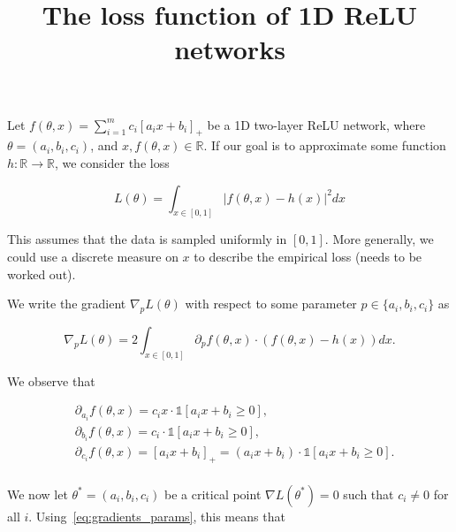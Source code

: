 \documentclass{article}
\title{{\bf The loss function of 1D ReLU networks}}
\author{}
\date{}
\newcommand{\RR}{\mathbb{R}}
\begin{document}
\maketitle

Let $f(\theta,x) = \sum_{i=1}^m c_i [a_ix + b_i]_+$ be a 1D two-layer ReLU
network, where $\theta = (a_i,b_i,c_i)$, and $x, f(\theta,x) \in \RR$. If our
goal is to approximate some function $h:\RR\rightarrow \RR$, we consider the
loss

\begin{equation}\label{eq:loss_uniform}
L(\theta) = \int_{x \in [0,1]} |f(\theta,x) - h(x)|^2 dx
\end{equation}

This assumes that the data is sampled uniformly in $[0,1]$. More generally, we
could use a discrete measure on $x$ to describe the empirical loss (needs to be
worked out).

We write the gradient $\nabla_p L(\theta)$ with respect to some parameter
$p \in \{a_i,b_i,c_i\}$ as

\begin{equation}\label{eq:gradient}
\nabla_p L(\theta) = 2 \int_{x \in [0,1]} \partial_p f(\theta,x) \cdot (f
(\theta,x)-h (x)) dx.
\end{equation}

We observe that

\begin{equation}\label{eq:gradients_params}
\begin{aligned}
& \partial_{a_i} f(\theta,x) = c_i x \cdot \mathds{1}
[a_i x
+ b_i \ge 0],\\
& \partial_{b_i} f(\theta,x) = c_i \cdot \mathds{1}
[a_i x
+ b_i \ge 0],\\
& \partial_{c_i} f(\theta,x) = [a_i x + b_i]_+ = (a_i x + b_i) \cdot \mathds{1}
[a_i x
+ b_i \ge 0].\\
\end{aligned}
\end{equation}

We now let $\theta^* = (a_i,b_i,c_i)$ be a critical point $\nabla L(\theta^*)
= 0$ such that $c_i \ne 0$ for all $i$. Using~\eqref{eq:gradients_params},
this means that
\end{document}
